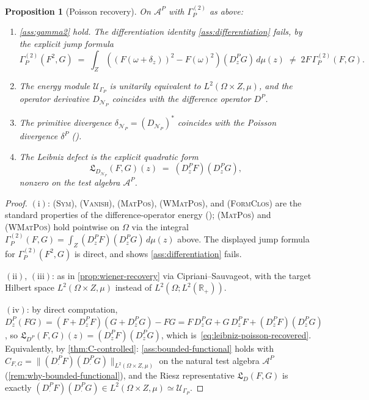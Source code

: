 \documentclass[11pt,reqno]{amsart}
\theoremstyle{plain}
\newtheorem{proposition}[theorem]{Proposition}
\theoremstyle{definition}
\theoremstyle{remark}
\newcommand{\R}{\mathbb{R}}
\newcommand{\cA}{\mathcal A}
\newcommand{\cN}{\mathcal N}
\newcommand{\cU}{\mathcal U}
\newcommand{\Lleib}{\mathfrak L}
\begin{document}
\begin{proposition}[Poisson recovery]\label{prop:poisson-recovery}
On $\cA^{P}$ with $\Gamma^{(2)}_{P}$ as above:
\begin{enumerate}
\item[$(\mathrm i)$] \cref{ass:gamma2} hold.
The differentiation identity \cref{ass:differentiation}
\emph{fails}, by the explicit jump formula
\[
  \Gamma^{(2)}_{P}(F^{2},G)
  \;=\;\int_{Z}((F(\omega+\delta_{z}))^{2}-F(\omega)^{2})(D^{P}_{z}G)\,d\mu(z)
  \;\neq\;2F\,\Gamma^{(2)}_{P}(F,G).
\]
\item[$(\mathrm{ii})$] The energy module $\cU_{\Gamma_{P}}$ is
unitarily equivalent to $L^{2}(\Omega\times Z,\mu)$, and the
operator derivative $D_{\cN_{P}}$ coincides with the difference
operator $D^{P}$.
\item[$(\mathrm{iii})$] The primitive divergence
$\delta_{\cN_{P}}=(D_{\cN_{P}})^{*}$ coincides with the Poisson
divergence $\delta^{P}$ (\cite[\S 6.2]{Nualart}).
\item[$(\mathrm{iv})$] The Leibniz defect is the explicit
quadratic form
\begin{equation}\label{eq:leibniz-poisson-recovered}
  \Lleib_{D_{\cN_{P}}}(F,G)(z)\;=\;(D^{P}_{z}F)(D^{P}_{z}G),
\end{equation}
nonzero on the test algebra $\cA^{P}$.
\end{enumerate}
\end{proposition}

\begin{proof}
$(\mathrm i)$: \textsc{(Sym)}, \textsc{(Vanish)},
\textsc{(MatPos)}, \textsc{(WMatPos)}, and \textsc{(FormClos)}
are the standard properties of the difference-operator energy
(\cite[Ch.~6]{Nualart}); \textsc{(MatPos)} and
\textsc{(WMatPos)} hold pointwise on $\Omega$ via the integral
$\Gamma^{(2)}_{P}(F,G)=\int_{Z}(D^{P}_{z}F)(D^{P}_{z}G)\,d\mu(z)$
above. The displayed jump formula for
$\Gamma^{(2)}_{P}(F^{2},G)$ is direct, and shows
\cref{ass:differentiation} fails.

$(\mathrm{ii})$, $(\mathrm{iii})$: as in
\cref{prop:wiener-recovery} via Cipriani--Sauvageot, with the
target Hilbert space $L^{2}(\Omega\times Z,\mu)$ instead of
$L^{2}(\Omega;L^{2}(\R_{+}))$.

$(\mathrm{iv})$: by direct computation,
$D^{P}_{z}(FG)=(F+D^{P}_{z}F)(G+D^{P}_{z}G)-FG=F\,D^{P}_{z}G+G\,D^{P}_{z}F+(D^{P}_{z}F)(D^{P}_{z}G)$,
so $\Lleib_{D^{P}}(F,G)(z)=(D^{P}_{z}F)(D^{P}_{z}G)$, which
is~\eqref{eq:leibniz-poisson-recovered}. Equivalently, by
\cref{thm:C-controlled}: \cref{ass:bounded-functional} holds
with $C_{F,G}=\|(D^{P}_{\cdot}F)(D^{P}_{\cdot}G)\|_{L^{2}(\Omega\times Z,\mu)}$
on the natural test algebra $\cA^{P}$
(\cref{rem:why-bounded-functional}), and the Riesz representative
$\Lleib_{D}(F,G)$ is exactly $(D^{P}_{\cdot}F)(D^{P}_{\cdot}G)\in
L^{2}(\Omega\times Z,\mu)\simeq\cU_{\Gamma_{P}}$.
\end{proof}
\end{document}
